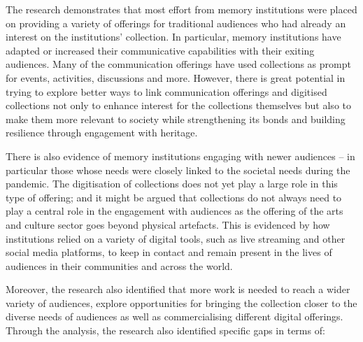 \documentclass{egpubl}
\begin{document}
The research demonstrates that most effort from memory institutions were placed on providing a variety of offerings for traditional audiences who had already an interest on the institutions' collection. In particular, memory institutions have adapted or increased  their communicative capabilities with their exiting audiences. Many of the communication offerings have used collections as prompt for events, activities, discussions and more. However, there is great potential in trying to explore better ways to link communication offerings and digitised collections not only to enhance interest for the collections themselves but also to make them more relevant to society while strengthening its bonds and  building resilience through engagement with heritage.

There is also evidence of memory institutions engaging with newer audiences – in particular those whose needs were closely linked to the societal needs during the pandemic. The digitisation of collections does not yet play a large role in this type of offering; and it might be argued that collections do not always need to play a central role in the engagement with audiences as the offering of the arts and culture sector goes beyond physical artefacts. This is evidenced by how institutions relied on a variety of digital tools, such as live streaming and other social media platforms, to keep in contact and remain present in the lives of audiences in their communities and across the world. 

Moreover, the research also identified that more work is needed to reach a wider variety of audiences, explore opportunities for bringing the collection closer to the diverse needs of audiences as well as commercialising different digital offerings. Through the analysis, the research also identified specific gaps in terms of:
\end{document}
